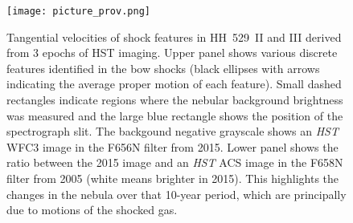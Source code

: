 \documentclass[fleqn,usenatbib]{mnras}
\begin{document}
\begin{figure}
  \centering
  \texttt{[image: picture\_prov.png]}
  \caption{
    Tangential velocities of shock features in HH~529~II and III
    derived from 3 epochs of HST imaging.
    Upper panel shows various discrete features identified in the bow shocks
    (black ellipses with arrows indicating the average proper motion of each feature).
    Small dashed rectangles indicate regions where the nebular background brightness was measured
    and the large blue rectangle shows the position of the spectrograph slit.
    The backgound negative grayscale shows an \textit{HST} WFC3 image in the F656N filter from 2015.
    Lower panel shows the ratio between the 2015 image and an \textit{HST} ACS image
    in the F658N filter from 2005 (white means brighter in 2015).
    This highlights the changes in the nebula over that 10-year period,
    which are principally due to motions of the shocked gas.
  }
  \label{fig:proper-motions}
\end{figure}
\end{document}
